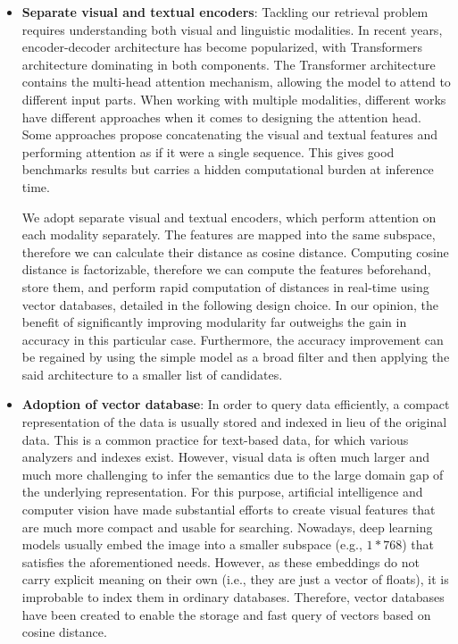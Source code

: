 \begin{itemize}
\vspace{-2mm}
    \item \textbf{Separate visual and textual encoders}: Tackling our retrieval problem requires understanding both visual and linguistic modalities. In recent years, encoder-decoder architecture has become popularized, with Transformers\cite{vaswani_attention_2017} architecture dominating in both components. The Transformer architecture contains the multi-head attention mechanism, allowing the model to attend to different input parts. When working with multiple modalities, different works have different approaches when it comes to designing the attention head. Some approaches propose concatenating the visual and textual features and performing attention as if it were a single sequence. This gives good benchmarks results but carries a hidden computational burden at inference time.
    
\vspace{-2mm}    
    We adopt separate visual and textual encoders, which perform attention on each modality separately. The features are mapped into the same subspace, therefore we can calculate their distance as cosine distance. Computing cosine distance is factorizable, therefore we can compute the features beforehand, store them, and perform rapid computation of distances in real-time using vector databases, detailed in the following design choice. In our opinion, the benefit of significantly improving modularity far outweighs the gain in accuracy in this particular case. Furthermore, the accuracy improvement can be regained by using the simple model as a broad filter and then applying the said architecture to a smaller list of candidates.
    
\vspace{-2mm}    
    \item \textbf{Adoption of vector database}: In order to query data efficiently, a compact representation of the data is usually stored and indexed in lieu of the original data. This is a common practice for text-based data, for which various analyzers and indexes exist. However, visual data is often much larger and much more challenging to infer the semantics due to the large domain gap of the underlying representation. For this purpose, artificial intelligence and computer vision have made substantial efforts to create visual features that are much more compact and usable for searching. Nowadays, deep learning models usually embed the image into a smaller subspace (e.g., $1 * 768$) that satisfies the aforementioned needs. However, as these embeddings do not carry explicit meaning on their own (i.e., they are just a vector of floats), it is improbable to index them in ordinary databases. Therefore, vector databases have been created to enable the storage and fast query of vectors based on cosine distance.
    

\end{itemize}
